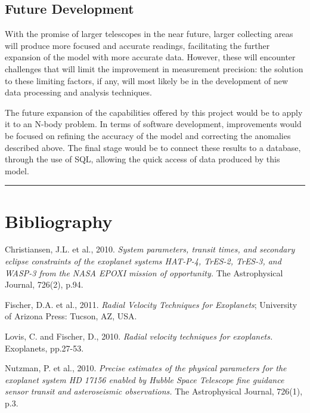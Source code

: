 \documentclass[11pt]{article}
\begin{document}
\hypertarget{future-development}{%
\subsection{Future Development}\label{future-development}}

With the promise of larger telescopes in the near future, larger
collecting areas will produce more focused and accurate readings,
facilitating the further expansion of the model with more accurate data.
However, these will encounter challenges that will limit the improvement
in measurement precision: the solution to these limiting factors, if
any, will most likely be in the development of new data processing and
analysis techniques.

The future expansion of the capabilities offered by this project would
be to apply it to an N-body problem. In terms of software development,
improvements would be focused on refining the accuracy of the model and
correcting the anomalies described above. The final stage would be to
connect these results to a database, through the use of SQL, allowing
the quick access of data produced by this model.

\newpage

\begin{center}\rule{0.5\linewidth}{0.5pt}\end{center}

\hypertarget{references}{%
\section*{{Bibliography}}\label{references}}

Christiansen, J.L. et al., 2010. \textit{System parameters, transit
times, and secondary eclipse constraints of the exoplanet systems
HAT-P-4, TrES-2, TrES-3, and WASP-3 from the NASA EPOXI mission of
opportunity.} The Astrophysical Journal, 726(2), p.94.

Fischer, D.A. et al., 2011. \textit{Radial Velocity Techniques for Exoplanets}; University of Arizona Press: Tucson, AZ, USA.

Lovis, C. and Fischer, D., 2010. \textit{Radial velocity techniques for
exoplanets.} Exoplanets, pp.27-53.

Nutzman, P. et al., 2010. \textit{Precise estimates of the physical parameters for the exoplanet system HD 17156 enabled by Hubble Space Telescope fine guidance sensor transit and asteroseismic observations.} The Astrophysical Journal, 726(1), p.3.
\end{document}
